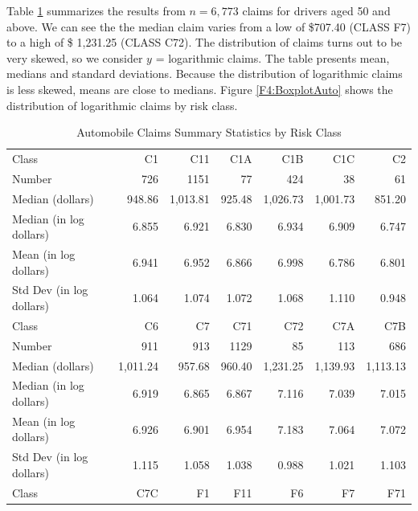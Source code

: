 Table \ref{T4:AutoSumStats} summarizes the results from $n=6,773$
claims for drivers aged 50 and above. We can see the the median
claim varies from a low of \$707.40 (CLASS F7) to a high of \$
1,231.25 (CLASS C72). The distribution of claims turns out to be
very skewed, so we consider $y$ = logarithmic claims. The table
presents mean, medians and standard deviations. Because the
distribution of logarithmic claims is less skewed, means are close
to medians. Figure \ref{F4:BoxplotAuto} shows the distribution of
logarithmic claims by risk class.



\begin{table}[h]
\caption{\label{T4:AutoSumStats} Automobile Claims Summary
Statistics by Risk Class}
\begin{tabular}{l|rrrrrr}
\hline
     Class &        C1  &        C11 &        C1A &        C1B &        C1C &        C2  \\
    Number &        726 &       1151 &         77 &        424 &         38 &         61 \\
Median (dollars) &     948.86 &   1,013.81 &     925.48 &   1,026.73 &   1,001.73 &     851.20 \\
Median (in log dollars) &      6.855 &      6.921 &      6.830 &      6.934 &      6.909 &      6.747 \\
Mean (in log dollars) &      6.941 &      6.952 &      6.866 &      6.998 &      6.786 &      6.801 \\
Std Dev (in log dollars) &      1.064 &      1.074 &      1.072 &      1.068 &      1.110 &      0.948 \\
\hline
     Class &        C6  &        C7  &        C71 &        C72 &        C7A &        C7B \\
    Number &        911 &        913 &       1129 &         85 &        113 &        686 \\
Median (dollars) &   1,011.24 &     957.68 &     960.40 &   1,231.25 &   1,139.93 &   1,113.13 \\
Median (in log dollars) &      6.919 &      6.865 &      6.867 &      7.116 &      7.039 &      7.015 \\
Mean (in log dollars) &      6.926 &      6.901 &      6.954 &      7.183 &      7.064 &      7.072 \\
Std Dev (in log dollars) &      1.115 &      1.058 &      1.038 &      0.988 &      1.021 &      1.103 \\
\hline
     Class &        C7C &        F1  &        F11 &        F6  &        F7  &        F71 \\

\end{tabular}
\end{table}
